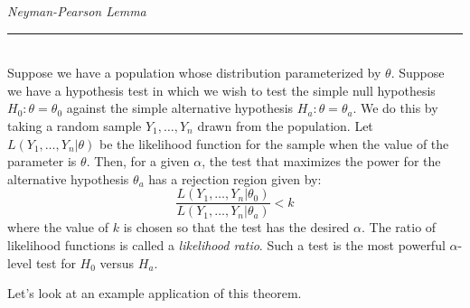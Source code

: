 \documentclass[notes.tex]{subfiles}
\begin{document}
\begin{framed}
\emph{Neyman-Pearson Lemma}\\
  \rule{\dimexpr{}\fboxrule}{.1pt} \\
Suppose we have a population whose distribution parameterized by $\theta$. Suppose we have a hypothesis test in which we wish to test the simple null hypothesis $H_0: \theta = \theta_0$ against the simple alternative hypothesis $H_a: \theta = \theta_a$. We do this by taking a random sample $Y_1, \dots, Y_n$ drawn from the population. Let $L(Y_1, \dots, Y_n|\theta)$ be the likelihood function for the sample when the value of the parameter is $\theta$. Then, for a given $\alpha$, the test that maximizes the power for the alternative hypothesis $\theta_a$ has a rejection region given by:
\[
\frac{ L(Y_1, \dots, Y_n|\theta_0) }{ L(Y_1, \dots, Y_n|\theta_a)} < k
\]
where the value of $k$ is chosen so that the test has the desired $\alpha$. The ratio of likelihood functions is called a \emph{likelihood ratio}. Such a test is the most powerful $\alpha$-level test for $H_0$ versus $H_a$.
\end{framed}

Let's look at an example application of this theorem.
\end{document}
